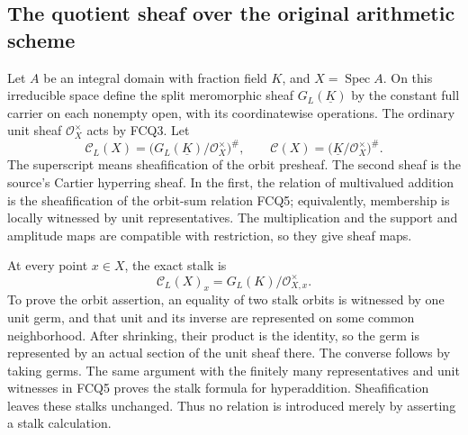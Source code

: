 \subsection{The quotient sheaf over the original arithmetic scheme}

Let $A$ be an integral domain with fraction field $K$, and
$X=\operatorname{Spec}A$. On this irreducible space define
the split meromorphic sheaf $G_L(\underline K)$ by the
constant full carrier on each nonempty open, with its
coordinatewise operations. The ordinary unit sheaf
$\mathcal O_X^\times$ acts by FCQ3. Let
\begin{equation}\tag{FCQ20}
\mathscr C_L(X)
 =\bigl(G_L(\underline K)/\mathcal O_X^\times\bigr)^\#,
\qquad
\mathscr C(X)
 =\bigl(\underline K/\mathcal O_X^\times\bigr)^\#.
\end{equation}
The superscript means sheafification of the orbit presheaf.
The second sheaf is the source's Cartier hyperring sheaf.
In the first, the relation of multivalued addition is the
sheafification of the orbit-sum relation FCQ5; equivalently,
membership is locally witnessed by unit representatives.
The multiplication and the support and amplitude maps
are compatible with restriction, so they give sheaf maps.

At every point $x\in X$, the exact stalk is
\begin{equation}\tag{FCQ21}
\mathscr C_L(X)_x
 =G_L(K)/\mathcal O_{X,x}^\times.
\end{equation}
To prove the orbit assertion, an equality of two stalk
orbits is witnessed by one unit germ, and that unit and
its inverse are represented on some common neighborhood.
After shrinking, their product is the identity, so the
germ is represented by an actual section of the unit
sheaf there. The converse follows by taking germs.
The same argument with the finitely many representatives
and unit witnesses in FCQ5 proves the stalk formula for
hyperaddition. Sheafification leaves these stalks
unchanged. Thus no relation is introduced merely by
asserting a stalk calculation.

